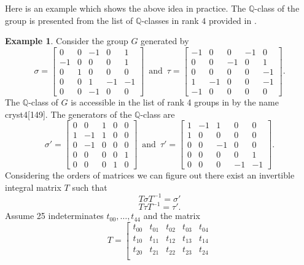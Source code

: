 \documentclass{article}
\theoremstyle{plain}
\theoremstyle{definition}
\newtheorem{example}[theorem]{Example}
\newcommand{\Q}{\ensuremath{\mathbb{Q}}}
\newcommand{\tand}{\ensuremath{\,\,\, \text{and} \,\,\,}}
\begin{document}
Here is an example which shows the above idea in practice. The $\Q$-class of the group is presented from the list of $\Q$-classes in rank $4$ provided in \cite{Hoshi}.
\begin{example}\label{exmp:Decompose}
Consider the group $G$ generated by 
$$
\sigma = \left[\begin{array}{rrrrr}
0 & 0 & -1 & 0 & 1 \\
-1 & 0 & 0 & 0 & 1 \\
0 & 1 & 0 & 0 & 0 \\
0 & 0 & 1 & -1 & -1 \\
0 & 0 & -1 & 0 & 0
\end{array}\right]
 \tand
\tau = \left[\begin{array}{rrrrr}
-1 & 0 & 0 & -1 & 0 \\
0 & 0 & -1 & 0 & 1 \\
0 & 0 & 0 & 0 & -1 \\
1 & -1 & 0 & 0 & -1 \\
-1 & 0 & 0 & 0 & 0
\end{array}\right].
$$
The $\Q$-class of $G$ is accessible in the list of rank 4 groups in \cite{Hoshi} by the name cryst4[149]. The generators of the $\Q$-class are
$$
\sigma' =\left[\begin{array}{rrr|rr}
0 & 0 & 1 & 0 & 0 \\
1 & -1 & 1 & 0 & 0 \\
0 & -1 & 0 & 0 & 0 \\
\hline
0 & 0 & 0 & 0 & 1 \\
0 & 0 & 0 & 1 & 0
\end{array}\right]
 \tand
\tau' = \left[\begin{array}{rrr|rr}
1 & -1 & 1 & 0 & 0 \\
1 & 0 & 0 & 0 & 0 \\
0 & 0 & -1 & 0 & 0 \\
\hline
0 & 0 & 0 & 0 & 1 \\
0 & 0 & 0 & -1 & -1
\end{array}\right].
$$
Considering the orders of matrices we can figure out there exist an invertible integral matrix $T$ such that 
$$T\sigma T^{-1}= \sigma'$$
$$T\tau T^{-1} = \tau'.$$
Assume 25 indeterminates $t_{00}  ,\ldots , t_{44}$ and the matrix
$$
T =\left[\begin{array}{rrrrr}
t_{00} & t_{01} & t_{02} & t_{03} & t_{04} \\
t_{10} & t_{11} & t_{12} & t_{13} & t_{14} \\
t_{20} & t_{21} & t_{22} & t_{23} & t_{24} \\

\end{array}$$
\end{example}
\end{document}
